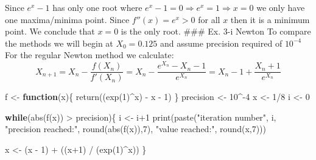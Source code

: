 \documentclass[
]{article}
\newenvironment{Shaded}{\begin{snugshade}}{\end{snugshade}}
\newcommand{\ControlFlowTok}[1]{\textcolor[rgb]{0.13,0.29,0.53}{\textbf{#1}}}
\newcommand{\DecValTok}[1]{\textcolor[rgb]{0.00,0.00,0.81}{#1}}
\newcommand{\FunctionTok}[1]{\textcolor[rgb]{0.00,0.00,0.00}{#1}}
\newcommand{\NormalTok}[1]{#1}
\newcommand{\OtherTok}[1]{\textcolor[rgb]{0.56,0.35,0.01}{#1}}
\newcommand{\SpecialCharTok}[1]{\textcolor[rgb]{0.00,0.00,0.00}{#1}}
\newcommand{\StringTok}[1]{\textcolor[rgb]{0.31,0.60,0.02}{#1}}
\begin{document}
Since \(e^x-1\) has only one root where
\(e^{x} - 1 =0\Rightarrow e^{x}=1\Rightarrow x = 0\) we only have one
maxima/minima point. Since \(f''(x) = e^{x} > 0\) for all \(x\) then it
is a minimum point. We conclude that \(x = 0\) is the only root. \#\#\#
Ex. 3-i Newton To compare the methods we will begin at \(X_0 = 0.125\)
and assume precision required of \(10^{-4}\) For the regular Newton
method we calculate: \[
    X_{n+1} = X_{n} - \frac{f(X_n)}{f'(X_n)} = X_n -\frac{e^{X_n} - X_n - 1}{e^{X_n}} = X_n - 1 + \frac{X_n + 1}{e^{X_n}}
\]

\begin{Shaded}
\begin{Highlighting}[]
\NormalTok{f }\OtherTok{\textless{}{-}} \ControlFlowTok{function}\NormalTok{(x)\{}
  \FunctionTok{return}\NormalTok{((}\FunctionTok{exp}\NormalTok{(}\DecValTok{1}\NormalTok{)}\SpecialCharTok{\^{}}\NormalTok{x) }\SpecialCharTok{{-}}\NormalTok{ x }\SpecialCharTok{{-}} \DecValTok{1}\NormalTok{)}
\NormalTok{\}}
\NormalTok{precision }\OtherTok{\textless{}{-}} \DecValTok{10}\SpecialCharTok{\^{}{-}}\DecValTok{4}
\NormalTok{x }\OtherTok{\textless{}{-}} \DecValTok{1}\SpecialCharTok{/}\DecValTok{8}
\NormalTok{i }\OtherTok{\textless{}{-}} \DecValTok{0}

\ControlFlowTok{while}\NormalTok{(}\FunctionTok{abs}\NormalTok{(}\FunctionTok{f}\NormalTok{(x)) }\SpecialCharTok{\textgreater{}}\NormalTok{ precision)\{}
\NormalTok{  i }\OtherTok{\textless{}{-}}\NormalTok{ i}\SpecialCharTok{+}\DecValTok{1}
  \FunctionTok{print}\NormalTok{(}\FunctionTok{paste}\NormalTok{(}\StringTok{"iteration number"}\NormalTok{, i, }\StringTok{"precision reached:"}\NormalTok{, }\FunctionTok{round}\NormalTok{(}\FunctionTok{abs}\NormalTok{(}\FunctionTok{f}\NormalTok{(x)),}\DecValTok{7}\NormalTok{), }\StringTok{"value reached:"}\NormalTok{, }\FunctionTok{round}\NormalTok{(x,}\DecValTok{7}\NormalTok{)))}

\NormalTok{  x }\OtherTok{\textless{}{-}}\NormalTok{ (x }\SpecialCharTok{{-}} \DecValTok{1}\NormalTok{) }\SpecialCharTok{+}\NormalTok{ ((x}\SpecialCharTok{+}\DecValTok{1}\NormalTok{) }\SpecialCharTok{/}\NormalTok{ (}\FunctionTok{exp}\NormalTok{(}\DecValTok{1}\NormalTok{)}\SpecialCharTok{\^{}}\NormalTok{x))}
\NormalTok{\}}
\end{Highlighting}
\end{Shaded}
\end{document}
